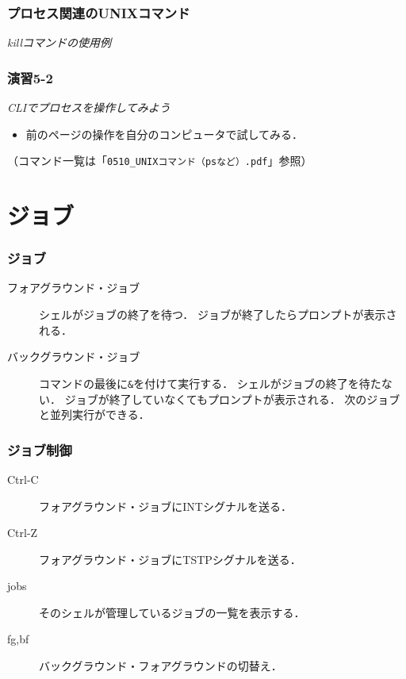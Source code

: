 \documentclass{beamer}                 %
\begin{document}
\begin{frame}[fragile]
  \frametitle{プロセス関連のUNIXコマンド}
  \emph{killコマンドの使用例}
\end{frame}

\begin{frame}[fragile]
  \frametitle{演習5-2}
  \emph{CLIでプロセスを操作してみよう}
\begin{itemize}
\item 前のページの操作を自分のコンピュータで試してみる．
\end{itemize}
  （コマンド一覧は「\texttt{0510\_UNIXコマンド（psなど）.pdf}」参照）
\end{frame}

\section{ジョブ}
\begin{frame}[fragile]
  \frametitle{ジョブ}
  \begin{description}
  \item[フォアグラウンド・ジョブ]
    シェルがジョブの終了を待つ．
    ジョブが終了したらプロンプトが表示される．

  \item[バックグラウンド・ジョブ]
    コマンドの最後に\texttt{\&}を付けて実行する．
    シェルがジョブの終了を待たない．
    ジョブが終了していなくてもプロンプトが表示される．
    次のジョブと並列実行ができる．
  \end{description}
\end{frame}

\begin{frame}[fragile]
  \frametitle{ジョブ制御}
  \begin{description}
  \item[Ctrl-C] フォアグラウンド・ジョブにINTシグナルを送る．
  \item[Ctrl-Z] フォアグラウンド・ジョブにTSTPシグナルを送る．
  \item[jobs] そのシェルが管理しているジョブの一覧を表示する．
  \item[fg,bf] バックグラウンド・フォアグラウンドの切替え．
  \end{description}
\end{frame}
\end{document}

